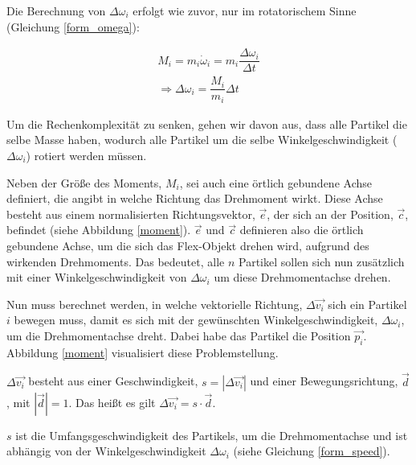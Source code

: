 Die Berechnung von $\Delta \omega_i$ erfolgt wie zuvor, nur im rotatorischem Sinne (Gleichung \ref{form_omega}):

\begin{equation}
\begin{split}
M_i = m_i   \dot{\omega}_i = m_i \dfrac{\Delta \omega_i}{\Delta t} \\
\Rightarrow  \Delta \omega_i = \dfrac{M_i}{m_i} \Delta t
\end{split}
\label{form_omega}
\end{equation}

Um die Rechenkomplexität zu senken, gehen wir davon aus, dass alle Partikel die selbe Masse haben, wodurch alle Partikel um die selbe Winkelgeschwindigkeit ($\Delta \omega_i$) rotiert werden müssen. 

Neben der Größe des Moments, $M_i$, sei auch eine örtlich gebundene Achse definiert, die angibt in welche Richtung das Drehmoment wirkt. Diese Achse besteht aus einem normalisierten Richtungsvektor, $\vec{e}$, der sich an der Position, $\vec{c}$, befindet (siehe Abbildung \ref{moment}). $\vec{e}$ und $\vec{c}$ definieren also die örtlich gebundene Achse, um die sich das Flex-Objekt drehen wird, aufgrund des wirkenden Drehmoments. Das bedeutet, alle $n$ Partikel sollen sich nun zusätzlich mit einer Winkelgeschwindigkeit von $\Delta \omega_i$ um diese Drehmomentachse drehen.

Nun muss berechnet werden, in welche vektorielle Richtung, $\Delta \vec{v_i}$ sich ein Partikel $i$ bewegen muss, damit es sich mit der gewünschten Winkelgeschwindigkeit, $\Delta \omega_i$, um die Drehmomentachse dreht. Dabei habe das Partikel die Position $\vec{p_i}$. Abbildung \ref{moment} visualisiert diese Problemstellung.



$\Delta \vec{v_i}$ besteht aus einer Geschwindigkeit, $s=|\Delta \vec{v_i}|$ und einer Bewegungsrichtung, $\vec{d}$, mit $|\vec{d}|=1$. Das heißt es gilt $\Delta \vec{v_i} = s \cdot \vec{d}$.

$s$ ist die Umfangsgeschwindigkeit des Partikels, um die Drehmomentachse und ist abhängig von der Winkelgeschwindigkeit $\Delta \omega_i$ (siehe Gleichung \ref{form_speed}).


